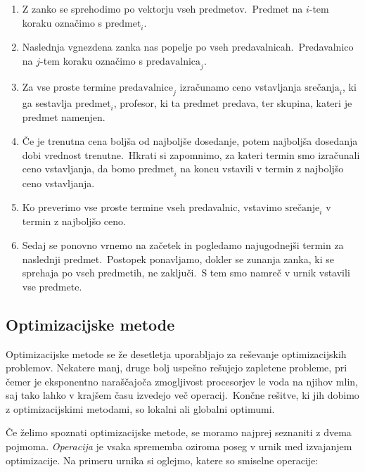 \documentclass[a4paper,10pt]{article}
\begin{document}
   \begin{enumerate}
  \item Z zanko se sprehodimo po vektorju vseh predmetov.\ Predmet na \(i\)-tem koraku
  označimo s \(\text{predmet}_i\).

  \item Naslednja vgnezdena zanka nas popelje po vseh predavalnicah.\ Predavalnico na
  \(j\)-tem koraku označimo s \(\text{predavalnica}_j\).

  \item Za vse proste termine \(\text{predavalnice}_j\) izračunamo ceno vstavljanja
  \(\text{srečanja}_i\), ki ga sestavlja \(\text{predmet}_i\), profesor, ki ta predmet predava,
  ter skupina, kateri je predmet namenjen.

  \item Če je trenutna cena boljša od najboljše dosedanje, potem najboljša dosedanja
  dobi vrednost trenutne.\ Hkrati si zapomnimo, za kateri termin smo izračunali ceno
  vstavljanja, da bomo \(\text{predmet}_i\) na koncu vstavili v termin z najboljšo
  ceno vstavljanja.

  \item Ko preverimo vse proste termine vseh predavalnic, vstavimo \(\text{srečanje}_i\)
  v termin z najboljšo ceno.

  \item Sedaj se ponovno vrnemo na začetek in pogledamo najugodnejši termin za naslednji
  predmet.\ Postopek ponavljamo, dokler se zunanja zanka, ki se sprehaja po vseh predmetih,
  ne zaključi.\ S tem smo namreč v urnik vstavili vse predmete.
\end{enumerate}

\subsection{Optimizacijske metode}

Optimizacijske metode se že desetletja uporabljajo za reševanje optimizacijskih problemov.
Nekatere manj, druge bolj uspešno rešujejo zapletene probleme, pri čemer je eksponentno
naraščajoča zmogljivost procesorjev le voda na njihov mlin, saj tako lahko v krajšem
času izvedejo več operacij.\ Končne rešitve, ki jih dobimo z optimizacijskimi metodami,
so lokalni ali globalni optimumi.

Če želimo spoznati optimizacijske metode, se moramo najprej seznaniti z dvema pojmoma.
\emph{Operacija} je vsaka sprememba oziroma poseg v urnik med izvajanjem optimizacije.
Na primeru urnika si oglejmo, katere so smiselne operacije:
\end{document}
